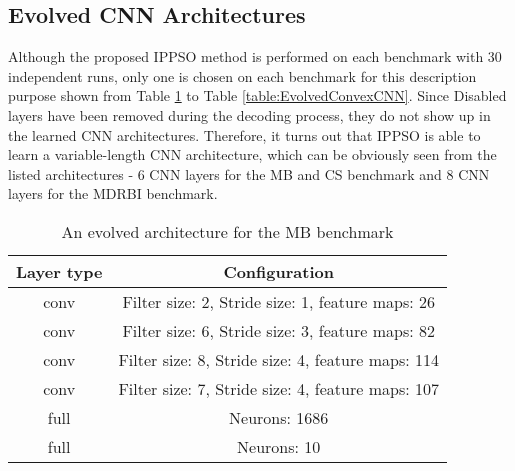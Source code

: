 \documentclass[conference]{IEEEtran}
\begin{document}
\subsection{Evolved CNN Architectures}\label{sec:EvolvedCNN}

Although the proposed IPPSO method is performed on each benchmark with 30 independent runs, only one is chosen on each benchmark for this description purpose shown from Table \ref{table:EvolvedMBCNN} to Table \ref{table:EvolvedConvexCNN}. Since Disabled layers have been removed during the decoding process, they do not show up in the learned CNN architectures. Therefore, it turns out that IPPSO is able to learn a variable-length CNN architecture, which can be obviously seen from the listed architectures - 6 CNN layers for the MB and CS benchmark and 8 CNN layers for the MDRBI benchmark.

\begin{table}[!t]
	\renewcommand{\arraystretch}{1.3}
	\caption{An evolved architecture for the MB benchmark}
	\label{table:EvolvedMBCNN}
	\centering
	\begin{tabular}{|c|c|}
		\hline
		Layer type & Configuration\\
		\hline
		conv & Filter size: 2, Stride size: 1, feature maps: 26\\
		\hline
		conv & Filter size: 6, Stride size: 3, feature maps: 82\\
		\hline
		conv & Filter size: 8, Stride size: 4, feature maps: 114\\
		\hline
		conv & Filter size: 7, Stride size: 4, feature maps: 107\\
		\hline
		full & Neurons: 1686\\
		\hline
		full & Neurons: 10\\
		\hline
	\end{tabular}
\end{table}
\end{document}
